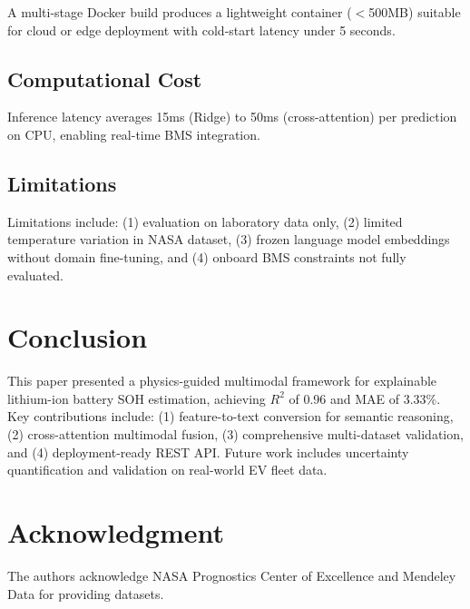 \documentclass[conference]{IEEEtran}
\begin{document}
A multi-stage Docker build produces a lightweight container ($<$500MB) suitable for cloud or edge deployment with cold-start latency under 5 seconds.

\subsection{Computational Cost}

Inference latency averages 15ms (Ridge) to 50ms (cross-attention) per prediction on CPU, enabling real-time BMS integration.

\subsection{Limitations}

Limitations include: (1) evaluation on laboratory data only, (2) limited temperature variation in NASA dataset, (3) frozen language model embeddings without domain fine-tuning, and (4) onboard BMS constraints not fully evaluated.

\section{Conclusion}

This paper presented a physics-guided multimodal framework for explainable lithium-ion battery SOH estimation, achieving $R^2$ of 0.96 and MAE of 3.33\%. Key contributions include: (1) feature-to-text conversion for semantic reasoning, (2) cross-attention multimodal fusion, (3) comprehensive multi-dataset validation, and (4) deployment-ready REST API. Future work includes uncertainty quantification and validation on real-world EV fleet data.

\section*{Acknowledgment}

The authors acknowledge NASA Prognostics Center of Excellence and Mendeley Data for providing datasets.
\end{document}
